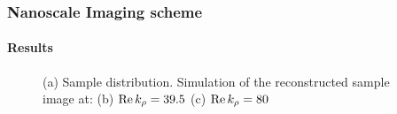 \documentclass[mathserif,16pt,xcolor=table]{beamer}
\begin{document}
  \setcounter{subfigure}{0}%
  \begin{frame}[t]
    \frametitle{Nanoscale Imaging scheme}
    \framesubtitle{Results}
    \begin{figure}[!htbp] \vspace*{-1cm} \centering \hspace*{-.25cm}
      \caption{(a) Sample distribution. Simulation of the reconstructed sample image at: (b) $\Re k_{\rho} = 39.5$ (c) $\Re k_{\rho} = 80$}
      \label{fig:simulation}
    \end{figure}
  \end{frame}
\end{document}
